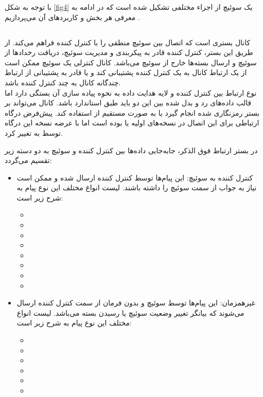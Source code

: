 با توجه به شکل \ref{fig4} یک سوئیچ  از اجزاء مختلفی تشکیل شده است که در ادامه به معرفی هر بخش و کاربرد‌های آن می‌پردازیم \cite{spec}.

\subsection{}
کانال  بستری است که اتصال بین سوئیچ منطقی را با کنترل کننده فراهم می‌کند. از طریق این بستر، کنترل کننده قادر به پیکربندی و مدیریت سوئیچ، دریافت رخداد‌ها از سوئیچ و ارسال بسته‌ها خارج از سوئیچ می‌باشد. کانال کنترلی یک سوئیچ ممکن است از یک ارتباط کانال  به یک کنترل کننده پشتیبانی کند و یا قادر به پشتیبانی از ارتباط چندگانه کانال  به چند کنترل کننده باشد.\\
نوع ارتباط بین کنترل کننده و لایه هدایت داده به نحوه پیاده سازی آن بستگی دارد اما قالب داده‌های رد و بدل شده بین این دو باید طبق استاندارد  باشد. کانال  می‌تواند بر بستر رمزنگاری شده  انجام گیرد یا به صورت مستقیم از  استفاده کند. پیش‌فرض درگاه ارتباطی برای این اتصال در نسخه‌های اولیه  یا  بوده است اما با عرضه نسخه  این درگاه توسط  به  تغییر کرد.
\pagebreak

در بستر ارتباط فوق الذکر، جا‌به‌جایی داده‌ها بین کنترل کننده و سوئیچ به دو دسته زیر تقسیم می‌گردد:
\begin{itemize}
	\item
کنترل کننده به سوئیچ: این پیام‌ها توسط کنترل کننده ارسال شده و ممکن است نیاز به جواب از سمت سوئیچ را داشته باشند. لیست انواع مختلف این نوع پیام به شرح زیر است:
	\begin{itemize}[noitemsep,topsep=0pt,parsep=0pt,partopsep=0pt]
		\item {}
		\item {}
		\item {}
		\item {}
		\item {}
		\item {}
		\item {}
		\item {}
	\end{itemize}
	\item
غیر‌همزمان: این پیام‌ها توسط سوئیچ و بدون فرمان از سمت کنترل کننده ارسال می‌شوند که بیانگر تغییر وضعیت سوئیچ یا رسیدن بسته می‌باشد. لیست انواع مختلف این نوع پیام به شرح زیر است:
	\begin{itemize}[noitemsep,topsep=0pt,parsep=0pt,partopsep=0pt]
		\item {}
		\item {}
		\item {}
		\item {}
		\item {}
		\item {}
	\end{itemize}
\end{itemize}

